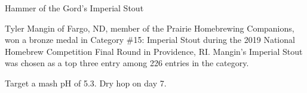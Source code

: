 \begin{recipe}{Hammer of the Gord's Imperial Stout}

\begin{aboutblock}
Tyler Mangin of Fargo, ND, member of the Prairie Homebrewing Companions, won a
bronze medal in Category \#15: Imperial Stout during the 2019 National Homebrew
Competition Final Round in Providence, RI. Mangin's Imperial Stout was chosen
as a top three entry among 226 entries in the category. \sourceaha
\end{aboutblock}


\begin{methodandtiming}
 
\begin{mashsteps}
\end{mashsteps}

\begin{fermentationsteps}
\end{fermentationsteps}

\begin{directions}
Target a mash pH of 5.3. Dry hop on day 7.
\end{directions}

\end{methodandtiming}

\recipebreak

\begin{ingredientsblock}

\begin{malts}
\end{malts}

\begin{hops}
\end{hops}


\end{ingredientsblock}

\end{recipe}

